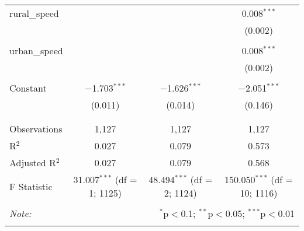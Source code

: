 \documentclass{article}
\begin{document}
\begin{table}[!htbp]
\begin{tabular}{@{\extracolsep{5pt}}lccc}
 rural\_speed &  &  & 0.008$^{***}$ \\ 
  &  &  & (0.002) \\ 
  & & & \\ 
 urban\_speed &  &  & 0.008$^{***}$ \\ 
  &  &  & (0.002) \\ 
  & & & \\ 
 Constant & $-$1.703$^{***}$ & $-$1.626$^{***}$ & $-$2.051$^{***}$ \\ 
  & (0.011) & (0.014) & (0.146) \\ 
  & & & \\ 
\hline \\[-1.8ex] 
Observations & 1,127 & 1,127 & 1,127 \\ 
R$^{2}$ & 0.027 & 0.079 & 0.573 \\ 
Adjusted R$^{2}$ & 0.027 & 0.079 & 0.568 \\ 
F Statistic & 31.007$^{***}$ (df = 1; 1125) & 48.494$^{***}$ (df = 2; 1124) & 150.050$^{***}$ (df = 10; 1116) \\ 
\hline 
\hline \\[-1.8ex] 
\textit{Note:}  & \multicolumn{3}{r}{$^{*}$p$<$0.1; $^{**}$p$<$0.05; $^{***}$p$<$0.01} \\ 
\normalsize 
\end{tabular} 
\end{table} 
\end{document}
